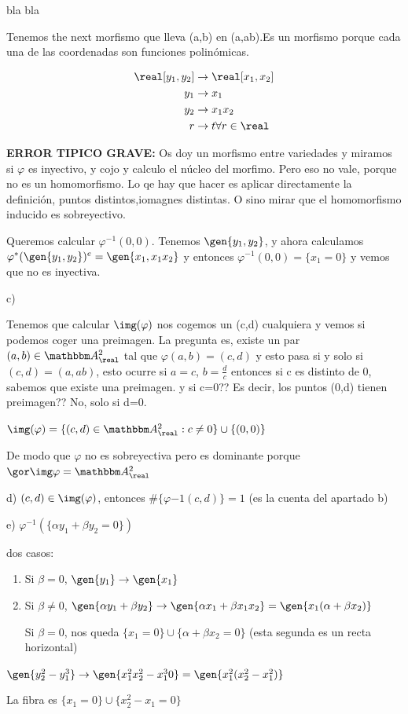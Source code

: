 \begin{problem}[7]
	
	bla bla
	
	\solution
	Tenemos the next morfismo que lleva (a,b) en (a,ab).Es un morfismo porque cada una de las coordenadas son funciones polinómicas.
	
	\begin{align*}
		\real[y_1, y_2] & \rightarrow \real[x_1,x_2] \\
		y_1 & \rightarrow x_1 \\
		y_2 & \rightarrow x_1x_2 \\
		r & \rightarrow t \forall r \in \real
	\end{align*}
	
	\textbf{ERROR TIPICO GRAVE:} Os doy un morfismo entre variedades y miramos si $\varphi$ es inyectivo, y cojo y calculo el  núcleo del morfimo. Pero eso no vale, porque no es un homomorfismo. Lo qe hay que hacer es aplicar directamente la definición, puntos distintos,iomagnes distintas. O sino mirar que el homomorfismo inducido es sobreyectivo.
	
	Queremos calcular $\varphi^{-1}(0,0)$. Tenemos $\gen{y_1, y_2}$, y ahora calculamos $\varphi^*(\gen{y_1, y_2})^e= \gen{x_1, x_1x_2}$ y entonces $\varphi^{-1}(0,0) = \{ x_1=0 \}$ y vemos que no es inyectiva.
	
	c)
	
	Tenemos que calcular $\img (\varphi)$ nos cogemos un (c,d) cualquiera y vemos si podemos coger una preimagen. La pregunta es, existe un par $(a,b) \in \A^2_{\real}$ tal que $\varphi(a,b)=(c,d)$ y esto pasa si y solo si $(c,d)=(a,ab)$, esto ocurre si $a=c$, $b=\frac{d}{c}$ entonces si c es distinto de 0, sabemos que existe una preimagen. y si c=0?? Es decir, los puntos (0,d) tienen preimagen?? No, solo si d=0.
	
	$\img(\varphi)= \{  (c,d) \in \A^2_{\real}: c\neq 0 \} \cup \{ (0,0) \}$
	
	De modo que $\varphi$ no es sobreyectiva pero es dominante porque $\cls{\img \varphi=\A^2_{\real}}$
	
	d) $(c,d) \in \img(\varphi)$, entonces $\#\{ \varphi{-1}(c,d) \}=1$ (es la cuenta del apartado b)
	
	e) $\varphi^{-1}(\{ \alpha y_1+ \beta y_2=0 \})$
	
	dos casos:
	\begin{enumerate}
		\item Si $\beta=0$, $\gen{y_1} \rightarrow \gen{x_1}$
		\item Si $\beta \neq 0$, $\gen{\alpha y_1+ \beta y_2} \rightarrow \gen{\alpha x_1+ \beta x_1x_2}=\gen{x_1(\alpha+\beta x_2)}$
		
		Si $\beta=0$, nos queda $\{ x_1=0 \} \cup \{ \alpha+ \beta x_2=0 \}$ (esta segunda es un recta horizontal)
	\end{enumerate}
	
	$\gen{y_2^2-y_1^3} \rightarrow \gen{x_1^2x_2^2-x_1^30} = \gen{x_1^2(x_2^2-x_1^2)}$
	
	La fibra es $\{ x_1=0 \} \cup \{ x_2^2-x_1=0 \}$
\end{problem}

